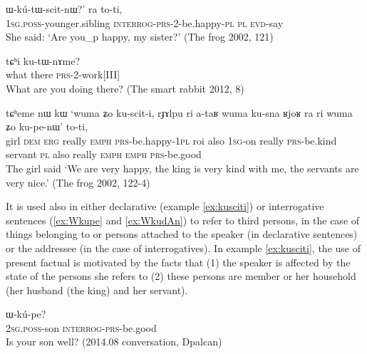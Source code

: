\documentclass[oldfontcommands,oneside,a4paper,11pt]{article}
\newcommand{\ipa}[1]{{\phon \mbox{#1}}} %
\begin{document}
\begin{exe}
\ex \label{ex:WkutWscitnW}
\gll  \ipa{`a-ʁi} 			\ipa{ɯ-kú-tɯ-scit-nɯ?}' 	\ipa{ra} 	\ipa{to-ti,} \\
\textsc{1sg.poss}-younger.sibling  \textsc{interrog-prs-}2-be.happy-\textsc{pl} \textsc{pl} \textsc{evd}-say \\
\glt She said: `Are you_p happy, my sister?' (The frog 2002, 121)
\end{exe}

\begin{exe}
\ex \label{ex:kutWnAme}
\gll \ipa{nɯtɕu}  \ipa{tɕʰi} \ipa{ku-tɯ-nɤme?}\\
what there \textsc{prs}-2-work[III] \\
\glt What are you doing there? (The smart rabbit 2012, 8)
\end{exe}

\begin{exe}
\ex \label{ex:kusciti}
\gll
\ipa{tɕʰeme} 	\ipa{nɯ} 	\ipa{kɯ} 	\ipa{`wuma} 	\ipa{ʑo} 	\ipa{ku-scit-i,} \ipa{rɟɤlpu} 	\ipa{ri} 	\ipa{a-taʁ} 	\ipa{wuma} 	\ipa{ku-sna} \ipa{ʁjoʁ} 	\ipa{ra} 	\ipa{ri} 	\ipa{wuma} 	\ipa{ʑo} 	\ipa{ku-pe-nɯ'} \ipa{to-ti,} \\
girl \textsc{dem} \textsc{erg} really \textsc{emph} \textsc{prs}-be.happy-\textsc{1pl}  roi also \textsc{1sg}-on really \textsc{prs}-be.kind servant \textsc{pl} also really \textsc{emph} \textsc{emph} \textsc{prs}-be.good \\
\glt The girl said `We are very happy, the king is very kind with me, the servants are very nice.'
(The frog 2002, 122-4)
\end{exe}

It is used also in either declarative (example \ref{ex:kusciti}) or  interrogative sentences (\ref{ex:Wkupe} and \ref{ex:WkudAn}) to refer to third persons, in the case of things belonging to or persons attached to the speaker (in declarative sentences) or the addressee (in the case of interrogatives). In example \ref{ex:kusciti}, the  use of present factual is motivated by the facts that (1) the speaker is affected by the state of the persons she refers to (2) these persons are member or her household (her husband (the king) and her servant).

\begin{exe}
\ex \label{ex:Wkupe}
\gll \ipa{nɤ-tɕɯ} \ipa{ɯ-kú-pe?}\\
\textsc{2sg.poss}-son \textsc{interrog-prs}-be.good\\
\glt Is your son well? (2014.08 conversation, Dpalcan)
\end{exe}
\end{document}
